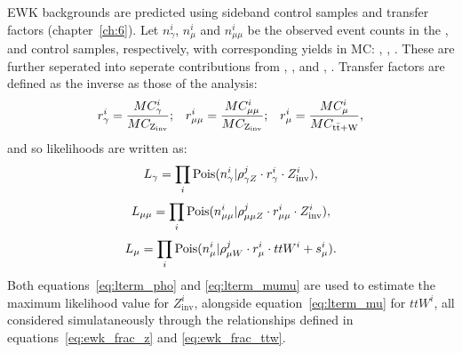 EWK backgrounds are predicted using sideband control samples and transfer 
factors (chapter~\ref{ch:6}). Let $n_{\gamma}^i$, $n_{\mu}^i$ and $n_{\mu\mu}^i$ be 
the observed event counts in the \gj, \mj and \mmj control samples, 
respectively, with corresponding yields in MC: \mcp, \mcm, \mcmm. These are
further seperated into seperate contributions from \zinv,
\mczinv, and , \mcttw. Transfer
factors are defined as the inverse as those of the analysis:
% 
\begin{equation}
r_{\gamma}^i = \frac{MC_{\gamma}^i}{MC_{\text{Z}_{\text{inv}}}};\;\;\;
r_{\mu\mu}^i = \frac{MC_{\mu\mu}^i}{MC_{\text{Z}_{\text{inv}}}};\;\;\;
r_{\mu}^i = \frac{MC_{\mu}^i}{MC_{\rm{t}\bar{\rm{t}}+\text{W}}},
\end{equation}
% 
and so likelihoods are written as:
% 
\begin{equation}
L_{\gamma} = \prod_i \text{Pois}(n_{\gamma}^i | \rho^j_{\gamma Z} \cdot r^i_{\gamma} \cdot Z^i_{\text{inv}}),
\label{eq:lterm_pho}
\end{equation}
\begin{equation}
L_{\mu\mu} = \prod_i \text{Pois}(n_{\mu\mu}^i | \rho^j_{\mu\mu Z} \cdot r^i_{\mu\mu} \cdot Z^i_{\text{inv}}),
\label{eq:lterm_mumu}
\end{equation}
\begin{equation}
L_{\mu} = \prod_i \text{Pois}(n_{\mu}^i | \rho^j_{\mu W} \cdot r^i_{\mu} \cdot ttW^i + s_{\mu}^i).
\label{eq:lterm_mu}
\end{equation}
% 
Both equations~\ref{eq:lterm_pho} and \ref{eq:lterm_mumu} are used to estimate the 
maximum likelihood value for $Z^i_{\text{inv}}$, alongside equation~\ref{eq:lterm_mu} 
for $ttW^i$, all considered simulataneously through the relationships defined in
equations~\ref{eq:ewk_frac_z} and \ref{eq:ewk_frac_ttw}.

